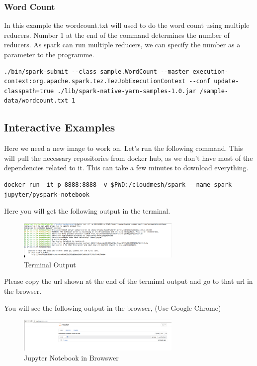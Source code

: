 \subsubsection{Word Count}

In this example the wordcount.txt will used to do the word count using
multiple reducers. Number 1 at the end of the command determines the
number of reducers. As spark can run multiple reducers, we can specify
the number as a parameter to the programme.

\begin{lstlisting}
./bin/spark-submit --class sample.WordCount --master execution-context:org.apache.spark.tez.TezJobExecutionContext --conf update-classpath=true ./lib/spark-native-yarn-samples-1.0.jar /sample-data/wordcount.txt 1
\end{lstlisting}

\subsection{Interactive Examples}

Here we need a new image to work on. Let's run the following command.
This will pull the necessary repositories from docker hub, as we don't
have most of the dependencies related to it. This can take a few minutes
to download everything.

\begin{lstlisting}
docker run -it-p 8888:8888 -v $PWD:/cloudmesh/spark --name spark jupyter/pyspark-notebook
\end{lstlisting}

Here you will get the following output in the terminal.

\begin{figure}[htbp]
\centering
\includegraphics[width=0.7\textwidth]{images/docker-spark-jupyter.png}
\caption{Terminal Output}
\end{figure}

Please copy the url shown at the end of the terminal output and go to
that url in the browser.

You will see the following output in the browser, (Use Google Chrome)

\begin{figure}[htbp]
\centering
\includegraphics[width=0.7\textwidth]{images/docker-spark-jup-1.png}
\caption{Jupyter Notebook in Browswer}
\end{figure}

